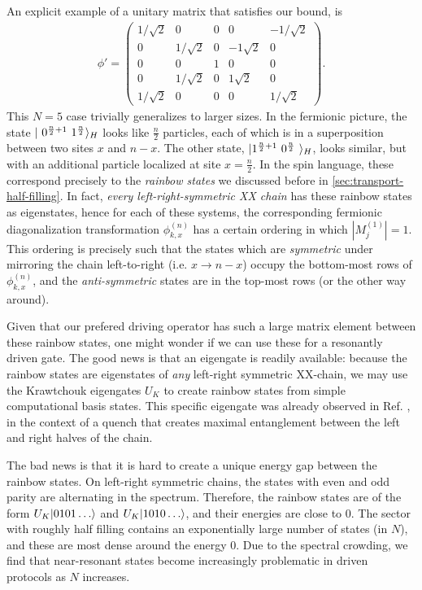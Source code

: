 An explicit example of a unitary matrix that satisfies our bound, is
\begin{align*}
\phi' = 
\begin{pmatrix}
            1/\sqrt{2} & 0 & 0 & 0 & -1/\sqrt{2} \\               
            0 & 1/\sqrt{2} & 0 & -1\sqrt{2} & 0 \\               
            0 & 0 & 1 & 0 & 0  \\
            0 & 1/\sqrt{2} & 0 & 1\sqrt{2} & 0 \\               
            1/\sqrt{2} & 0 & 0 & 0 & 1/\sqrt{2}         
\end{pmatrix}.
\end{align*}
This $N=5$ case trivially generalizes to larger sizes. In the fermionic picture, the state $\lvert\ 0^{ {n\over 2}+1} \  1^{n\over 2}\rangle_{H}$ looks like $\frac{n}{2}$ particles, each of which is in a superposition between two sites $x$ and $n-x$. The other state, $\ket{ 1^{{n\over 2}+1} \ 0^{n \over 2} \ }_H$, looks similar, but with an additional particle localized at site $x=\frac{n}{2}$. In the spin language, these correspond precisely to the \emph{rainbow states} we discussed before in \cref{sec:transport-half-filling}. In fact, \emph{every left-right-symmetric XX chain} has these rainbow states as eigenstates, hence for each of these systems, the corresponding fermionic diagonalization transformation $\phi^{(n)}_{k,x}$ has a certain ordering in which $|M_j^{(1)}| = 1$. This ordering is precisely such that the states which are \emph{symmetric} under mirroring the chain left-to-right (i.e. $x \rightarrow n-x$) occupy the bottom-most rows of $\phi^{(n)}_{k,x}$, and the \emph{anti-symmetric} states are in the top-most rows (or the other way around). 

Given that our prefered driving operator has such a large matrix element between these rainbow states, one might wonder if we can use these for a resonantly driven gate. The good news is that an eigengate is readily available: because the rainbow states are eigenstates of \emph{any} left-right symmetric XX-chain, we may use the Krawtchouk eigengates $U_K$ to create rainbow states from simple computational basis states. This specific eigengate was already observed in Ref. \cite{Alkurtass2014}, in the context of a quench that creates maximal entanglement between the left and right halves of the chain. 

The bad news is that it is hard to create a unique energy gap between the rainbow states. On left-right symmetric chains, the states with even and odd parity are alternating in the spectrum. Therefore, the rainbow states are of the form $U_K \lvert0101 \ldots \rangle$ and $U_K \lvert1010 \ldots \rangle$, and their energies are close to $0$. The sector with roughly half filling contains an exponentially large number of states (in $N$), and these are most dense around the energy $0$. Due to the spectral crowding, we find that near-resonant states become increasingly problematic in driven protocols as $N$ increases. 

